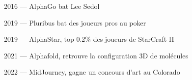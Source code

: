 \begin{frame}{2016 --- AlphaGo bat Lee Sedol}
\end{frame}

\begin{frame}{2019 --- Pluribus bat des joueurs pros au poker}
\end{frame}

\begin{frame}{2019 --- AlphaStar, top 0.2\% des joueurs de StarCraft II}
\end{frame}

\begin{frame}{2021 --- Alphafold, retrouve la configuration 3D de molécules}
\end{frame}

\begin{frame}{2022 --- MidJourney, gagne un concours d'art au Colorado}
\end{frame}
